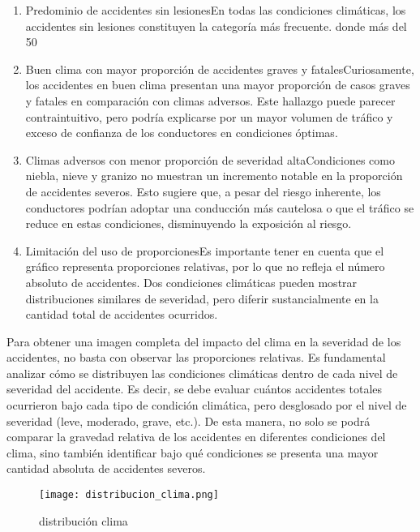\documentclass{book}
\begin{document}
\begin{enumerate}

\item Predominio de accidentes sin lesionesEn todas las condiciones climáticas, los accidentes sin lesiones constituyen la categoría más frecuente. donde más del 50%

\item Buen clima con mayor proporción de accidentes graves y fatalesCuriosamente, los accidentes en buen clima presentan una mayor proporción de casos graves y fatales en comparación con climas adversos. Este hallazgo puede parecer contraintuitivo, pero podría explicarse por un mayor volumen de tráfico y exceso de confianza de los conductores en condiciones óptimas.

\item Climas adversos con menor proporción de severidad altaCondiciones como niebla, nieve y granizo no muestran un incremento notable en la proporción de accidentes severos. Esto sugiere que, a pesar del riesgo inherente, los conductores podrían adoptar una conducción más cautelosa o que el tráfico se reduce en estas condiciones, disminuyendo la exposición al riesgo.

\item Limitación del uso de proporcionesEs importante tener en cuenta que el gráfico representa proporciones relativas, por lo que no refleja el número absoluto de accidentes. Dos condiciones climáticas pueden mostrar distribuciones similares de severidad, pero diferir sustancialmente en la cantidad total de accidentes ocurridos.

\end{enumerate}

Para obtener una imagen completa del impacto del clima en la severidad de los accidentes, no basta con observar las proporciones relativas. Es fundamental analizar cómo se distribuyen las condiciones climáticas dentro de cada nivel de severidad del accidente. Es decir, se debe evaluar cuántos accidentes totales ocurrieron bajo cada tipo de condición climática, pero desglosado por el nivel de severidad (leve, moderado, grave, etc.). De esta manera, no solo se podrá comparar la gravedad relativa de los accidentes en diferentes condiciones del clima, sino también identificar bajo qué condiciones se presenta una mayor cantidad absoluta de accidentes severos.

\begin{figure}[htbp]
\centering
\texttt{[image: distribucion\_clima.png]}
\caption{\label{fig:distribución clima}distribución clima}
\end{figure}
\end{document}
